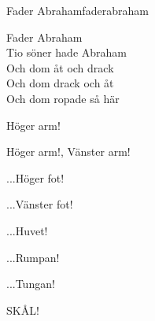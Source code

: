 \begin{song}{Fader Abraham}{faderabraham}
\begin{vers}
\repopen Fader Abraham \repclose\\
Tio söner hade Abraham\\
Och dom åt och drack\\
Och dom drack och åt\\
Och dom ropade så här\\
\end{vers}
\begin{vers}
Höger arm!
\end{vers}
\begin{vers}
Höger arm!, Vänster arm!
\end{vers}
\begin{vers}
...Höger fot!
\end{vers}
\begin{vers}
...Vänster fot!
\end{vers}
\begin{vers}
...Huvet!
\end{vers}
\begin{vers}
...Rumpan!
\end{vers}
\begin{vers}
...Tungan!
\end{vers}
\begin{vers}
SKÅL!
\end{vers}
\end{song}
